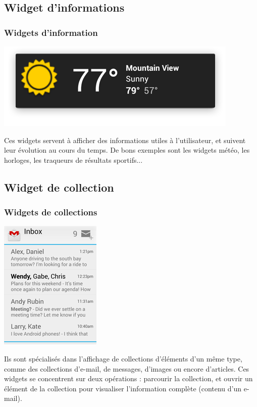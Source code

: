 \documentclass{beamer}
\begin{document}
\subsection{Widget d'informations}
\begin{frame}
\frametitle{Widgets d'information}
\begin{center}
\includegraphics[scale=0.3]{widgets_info.png}
\end{center}

Ces widgets servent à afficher des informations utiles à l'utilisateur, et suivent leur évolution au cours du temps. De bons exemples sont les widgets météo, les horloges, les traqueurs de résultats sportifs...
\end{frame}

\subsection{Widget de collection}
\begin{frame}
\frametitle{Widgets de collections}
\begin{center}
\includegraphics[scale=0.4]{widgets_collection_gmail.png}
\end{center}

Ils sont spécialisés dans l'affichage de collections d'éléments d'un même type, comme des collections d'e-mail, de messages, d'images ou encore d’articles. Ces widgets se concentrent sur deux opérations : parcourir la collection, et ouvrir un élément de la collection pour visualiser l'information complète (contenu d'un e-mail).
\end{frame}
\end{document}
